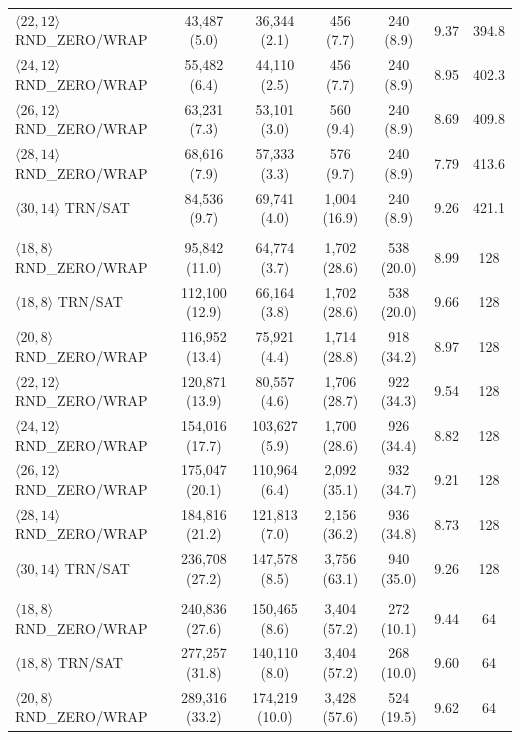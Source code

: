 \begin{table}[p]
\begin{tabular}{lcccccc}
$\langle 22,12\rangle$ RND\_ZERO/WRAP & 43,487 (5.0) & 36,344 (2.1) & 456 (7.7) & 240 (8.9) & 9.37 & 394.8 \\
$\langle 24,12\rangle$ RND\_ZERO/WRAP & 55,482 (6.4) & 44,110 (2.5) & 456 (7.7) & 240 (8.9) & 8.95 & 402.3 \\
$\langle 26,12\rangle$ RND\_ZERO/WRAP & 63,231 (7.3) & 53,101 (3.0) & 560 (9.4) & 240 (8.9) & 8.69 & 409.8 \\
$\langle 28,14\rangle$ RND\_ZERO/WRAP & 68,616 (7.9) & 57,333 (3.3) & 576 (9.7) & 240 (8.9) & 7.79 & 413.6 \\
$\langle 30,14\rangle$ TRN/SAT & 84,536 (9.7) & 69,741 (4.0) & 1,004 (16.9) & 240 (8.9) & 9.26 & 421.1 \\
\addlinespace
\multicolumn{7}{l}{\textbf{TDLA30-300 (limit: 151 cycles)}} \\
$\langle 18,8\rangle$ RND\_ZERO/WRAP & 95,842 (11.0) & 64,774 (3.7) & 1,702 (28.6) & 538 (20.0) & 8.99 & 128 \\
$\langle 18,8\rangle$ TRN/SAT & 112,100 (12.9) & 66,164 (3.8) & 1,702 (28.6) & 538 (20.0) & 9.66 & 128 \\
$\langle 20,8\rangle$ RND\_ZERO/WRAP & 116,952 (13.4) & 75,921 (4.4) & 1,714 (28.8) & 918 (34.2) & 8.97 & 128 \\
$\langle 22,12\rangle$ RND\_ZERO/WRAP & 120,871 (13.9) & 80,557 (4.6) & 1,706 (28.7) & 922 (34.3) & 9.54 & 128 \\
$\langle 24,12\rangle$ RND\_ZERO/WRAP & 154,016 (17.7) & 103,627 (5.9) & 1,700 (28.6) & 926 (34.4) & 8.82 & 128 \\
$\langle 26,12\rangle$ RND\_ZERO/WRAP & 175,047 (20.1) & 110,964 (6.4) & 2,092 (35.1) & 932 (34.7) & 9.21 & 128 \\
$\langle 28,14\rangle$ RND\_ZERO/WRAP & 184,816 (21.2) & 121,813 (7.0) & 2,156 (36.2) & 936 (34.8) & 8.73 & 128 \\
$\langle 30,14\rangle$ TRN/SAT & 236,708 (27.2) & 147,578 (8.5) & 3,756 (63.1) & 940 (35.0) & 9.26 & 128 \\
\addlinespace
\multicolumn{7}{l}{\textbf{TDLB100-400 (limit: 113 cycles)}} \\
$\langle 18,8\rangle$ RND\_ZERO/WRAP & 240,836 (27.6) & 150,465 (8.6) & 3,404 (57.2) & 272 (10.1) & 9.44 & 64 \\
$\langle 18,8\rangle$ TRN/SAT & 277,257 (31.8) & 140,110 (8.0) & 3,404 (57.2) & 268 (10.0) & 9.60 & 64 \\
$\langle 20,8\rangle$ RND\_ZERO/WRAP & 289,316 (33.2) & 174,219 (10.0) & 3,428 (57.6) & 524 (19.5) & 9.62 & 64 \\

\end{tabular}
\end{table}
